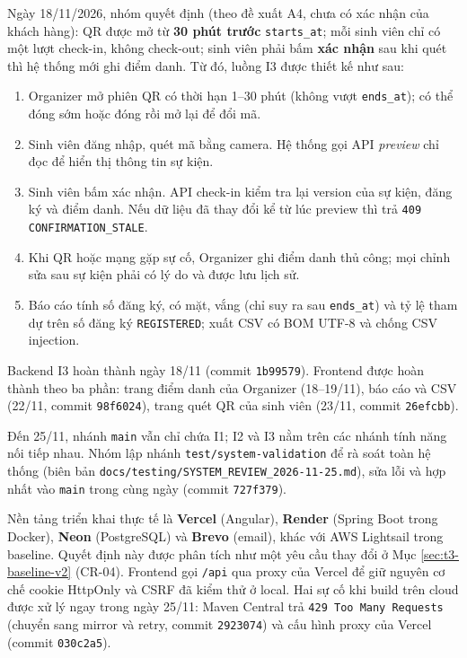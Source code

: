 
Ngày 18/11/2026, nhóm quyết định (theo đề xuất A4, chưa có xác nhận của khách hàng): QR được mở từ \textbf{30 phút trước} \texttt{starts\_at}; mỗi sinh viên chỉ có một lượt check-in, không check-out; sinh viên phải bấm \textbf{xác nhận} sau khi quét thì hệ thống mới ghi điểm danh. Từ đó, luồng I3 được thiết kế như sau:
\begin{enumerate}
    \item Organizer mở phiên QR có thời hạn 1--30 phút (không vượt \texttt{ends\_at}); có thể đóng sớm hoặc đóng rồi mở lại để đổi mã.
    \item Sinh viên đăng nhập, quét mã bằng camera. Hệ thống gọi API \textit{preview} chỉ đọc để hiển thị thông tin sự kiện.
    \item Sinh viên bấm xác nhận. API check-in kiểm tra lại version của sự kiện, đăng ký và điểm danh. Nếu dữ liệu đã thay đổi kể từ lúc preview thì trả \texttt{409 CONFIRMATION\_STALE}.
    \item Khi QR hoặc mạng gặp sự cố, Organizer ghi điểm danh thủ công; mọi chỉnh sửa sau sự kiện phải có lý do và được lưu lịch sử.
    \item Báo cáo tính số đăng ký, có mặt, vắng (chỉ suy ra sau \texttt{ends\_at}) và tỷ lệ tham dự trên số đăng ký \texttt{REGISTERED}; xuất CSV có BOM UTF-8 và chống CSV injection.
\end{enumerate}

Backend I3 hoàn thành ngày 18/11 (commit \texttt{1b99579}). Frontend được hoàn thành theo ba phần: trang điểm danh của Organizer (18--19/11), báo cáo và CSV (22/11, commit \texttt{98f6024}), trang quét QR của sinh viên (23/11, commit \texttt{26efcbb}).


Đến 25/11, nhánh \texttt{main} vẫn chỉ chứa I1; I2 và I3 nằm trên các nhánh tính năng nối tiếp nhau. Nhóm lập nhánh \texttt{test/system-validation} để rà soát toàn hệ thống (biên bản \texttt{docs/testing/SYSTEM\_REVIEW\_2026-11-25.md}), sửa lỗi và hợp nhất vào \texttt{main} trong cùng ngày (commit \texttt{727f379}).

Nền tảng triển khai thực tế là \textbf{Vercel} (Angular), \textbf{Render} (Spring Boot trong Docker), \textbf{Neon} (PostgreSQL) và \textbf{Brevo} (email), khác với AWS Lightsail trong baseline. Quyết định này được phân tích như một yêu cầu thay đổi ở Mục \ref{sec:t3-baseline-v2} (CR-04). Frontend gọi \texttt{/api} qua proxy của Vercel để giữ nguyên cơ chế cookie HttpOnly và CSRF đã kiểm thử ở local. Hai sự cố khi build trên cloud được xử lý ngay trong ngày 25/11: Maven Central trả \texttt{429 Too Many Requests} (chuyển sang mirror và retry, commit \texttt{2923074}) và cấu hình proxy của Vercel (commit \texttt{030c2a5}).

